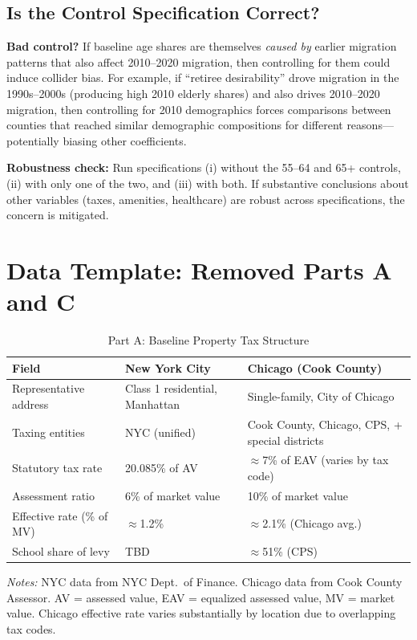 \subsection{Is the Control Specification Correct?}

\textbf{Bad control?} If baseline age shares are themselves \textit{caused by} earlier migration patterns that also affect 2010--2020 migration, then controlling for them could induce collider bias. For example, if ``retiree desirability'' drove migration in the 1990s--2000s (producing high 2010 elderly shares) and also drives 2010--2020 migration, then controlling for 2010 demographics forces comparisons between counties that reached similar demographic compositions for different reasons---potentially biasing other coefficients.

\textbf{Robustness check:} Run specifications (i) without the 55--64 and 65+ controls, (ii) with only one of the two, and (iii) with both. If substantive conclusions about other variables (taxes, amenities, healthcare) are robust across specifications, the concern is mitigated.

\section{Data Template: Removed Parts A and C}

\begin{table}[htbp!]
\centering
\caption{Part A: Baseline Property Tax Structure}
\label{tab:baseline_comparison}
\small
\begin{tabular}{lll}
\toprule
\textbf{Field} & \textbf{New York City} & \textbf{Chicago (Cook County)} \\
\midrule
Representative address & Class 1 residential, Manhattan & Single-family, City of Chicago \\
Taxing entities & NYC (unified) & Cook County, Chicago, CPS, + special districts \\
Statutory tax rate & 20.085\% of AV & $\approx$7\% of EAV (varies by tax code) \\
Assessment ratio & 6\% of market value & 10\% of market value \\
Effective rate (\% of MV) & $\approx$1.2\% & $\approx$2.1\% (Chicago avg.) \\
School share of levy & TBD & $\approx$51\% (CPS) \\
\bottomrule
\end{tabular}

\vspace{0.5em}
\raggedright
\footnotesize
\textit{Notes:} NYC data from NYC Dept.\ of Finance. Chicago data from Cook County Assessor. AV = assessed value, EAV = equalized assessed value, MV = market value. Chicago effective rate varies substantially by location due to overlapping tax codes.
\end{table}

